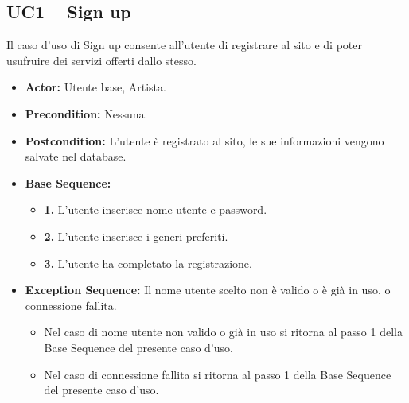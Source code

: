 \subsection{UC1 -- Sign up}
Il caso d'uso di Sign up consente all'utente di registrare al sito 
e di poter usufruire dei servizi offerti dallo stesso. 
\begin{itemize}
    \item \textbf{Actor:} Utente base, Artista.
    \item \textbf{Precondition:} Nessuna.
    \item \textbf{Postcondition:} L'utente è registrato al sito, le sue informazioni vengono salvate nel database.
    \item \textbf{Base Sequence:} 
        \begin{itemize}
            \item \textbf{1.} L'utente inserisce nome utente e password.
            \item \textbf{2.} L'utente inserisce i generi preferiti.
            \item \textbf{3.} L'utente ha completato la registrazione.
        \end{itemize}
    \item \textbf{Exception Sequence:} Il nome utente scelto non è valido o è già in uso, o connessione fallita.
        \begin{itemize}
            \item Nel caso di nome utente non valido o già in uso si ritorna al passo 1 della Base Sequence del presente caso d'uso.
            \item Nel caso di connessione fallita si ritorna al passo 1 della Base Sequence del presente caso d'uso. 
        \end{itemize}
    
\end{itemize}
\vspace{1cm}

